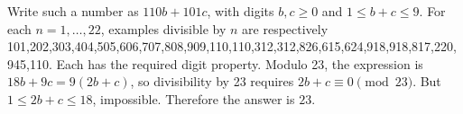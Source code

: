Write such a number as $110b+101c$, with digits $b,c\ge0$ and $1\le b+c\le9$. For each $n=1,\ldots,22$, examples divisible by $n$ are respectively 101,202,303,404,505,606,707,808,909,110,110,312,312,826,615,624,918,918,817,220,945,110. Each has the required digit property. Modulo 23, the expression is $18b+9c=9(2b+c)$, so divisibility by 23 requires $2b+c\equiv0\pmod{23}$. But $1\le2b+c\le18$, impossible. Therefore the answer is $\boxed{23}$.
